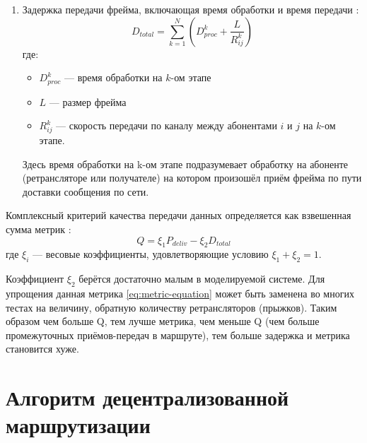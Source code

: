\begin{enumerate}
        При превышении порога 10000 бит/с резко возрастает \cite{goldsmith2005wireless}:
        \begin{itemize}
        \item Вероятность ошибок (BER $\sim e^{B/B_{norm}}$)
        \item Требования к отношению сигнал-шум (SNR)
        \end{itemize}

    \item Задержка передачи фрейма, включающая время обработки и время передачи \cite{kleinrock1975}:
    \begin{equation}
    D_{total} = \sum_{k=1}^N \left( D_{proc}^k + \frac{L}{R_{ij}^k} \right)
    \end{equation}
    где:
    \begin{itemize}
    \item $D_{proc}^k$ — время обработки на $k$-ом этапе
    \item $L$ — размер фрейма
    \item $R_{ij}^k$ — скорость передачи по каналу между абонентами $i$ и $j$ на $k$-ом этапе.
    \end{itemize}

    Здесь время обработки на k-ом этапе подразумевает обработку на абоненте (ретрансляторе или получателе) на котором произошёл приём фрейма по пути 
    доставки сообщения по сети.

\end{enumerate}

Комплексный критерий качества передачи данных определяется как взвешенная сумма метрик \cite{kleinrock1975}:
\begin{equation}
\label{eq:metric-equation}
Q = \xi_1 P_{deliv} - \xi_2 D_{total}
\end{equation}
где $\xi_i$ — весовые коэффициенты, удовлетворяющие условию $\xi_1 + \xi_2 = 1$.

Коэффициент $\xi_2$ берётся достаточно малым в моделируемой системе. Для упрощения данная метрика \ref{eq:metric-equation} может быть заменена во многих 
тестах на величину, обратную количеству ретрансляторов (прыжков). Таким образом чем больше Q, тем лучше метрика, чем меньше Q (чем больше промежуточных 
приёмов-передач в маршруте), тем больше задержка и метрика становится хуже.

\section{Алгоритм децентрализованной маршрутизации} \label{ch2:sec2}

